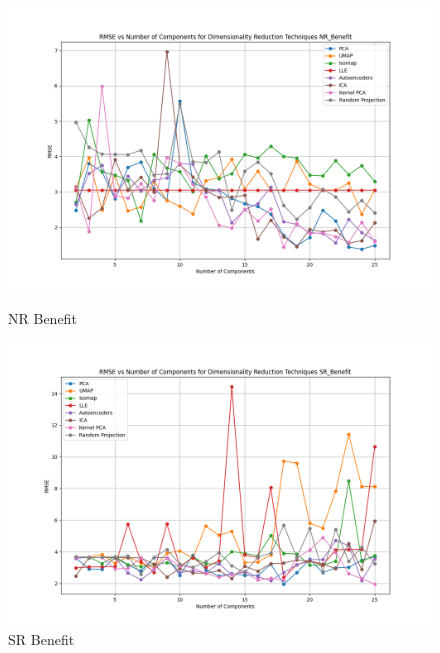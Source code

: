 \begin{figure}[H]
    \centering
    \begin{minipage}{0.45\textwidth}
        \centering
        \includegraphics[width=\linewidth]{reg_section_all/images_dimred_results/dimensionality_reduction_rmse_plot_NR_Benefit_best.png}
        \caption{NR Benefit}
        \label{fig:nr_ben_reg_dimred_training}
    \end{minipage}\hfill
    \begin{minipage}{0.45\textwidth}
        \centering
        \includegraphics[width=\linewidth]{reg_section_all/images_dimred_results/dimensionality_reduction_rmse_plot_SR_Benefit_best.png}
        \caption{SR Benefit}
        \label{fig:sr_ben_reg_dimred_training}
    \end{minipage}
\end{figure}

